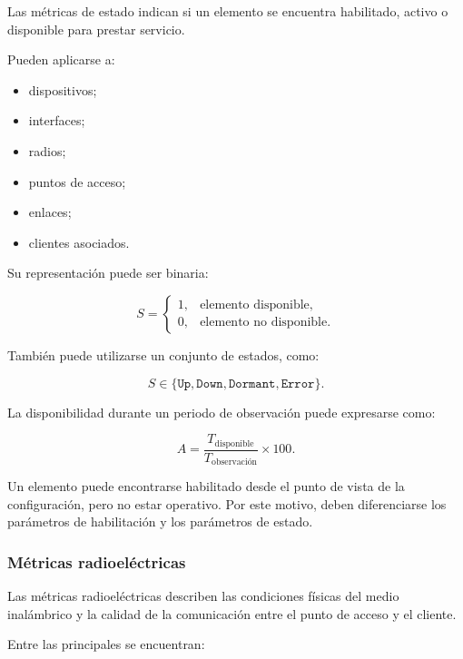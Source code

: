 Las métricas de estado indican si un elemento se encuentra habilitado,
activo o disponible para prestar servicio.

Pueden aplicarse a:

\begin{itemize}
    \item dispositivos;

    \item interfaces;

    \item radios;

    \item puntos de acceso;

    \item enlaces;

    \item clientes asociados.
\end{itemize}

Su representación puede ser binaria:

\[
    S =
    \begin{cases}
        1, & \text{elemento disponible},\\
        0, & \text{elemento no disponible}.
    \end{cases}
\]

También puede utilizarse un conjunto de estados, como:

\[
    S
    \in
    \{
        \texttt{Up},
        \texttt{Down},
        \texttt{Dormant},
        \texttt{Error}
    \}.
\]

La disponibilidad durante un periodo de observación puede expresarse
como:

\[
    A =
    \frac{
        T_{\mathrm{disponible}}
    }{
        T_{\mathrm{observación}}
    }
    \times
    100.
\]

Un elemento puede encontrarse habilitado desde el punto de vista de la
configuración, pero no estar operativo. Por este motivo, deben
diferenciarse los parámetros de habilitación y los parámetros de estado.


\subsubsection*{Métricas radioeléctricas}

Las métricas radioeléctricas describen las condiciones físicas del medio
inalámbrico y la calidad de la comunicación entre el punto de acceso y el
cliente.

Entre las principales se encuentran:

